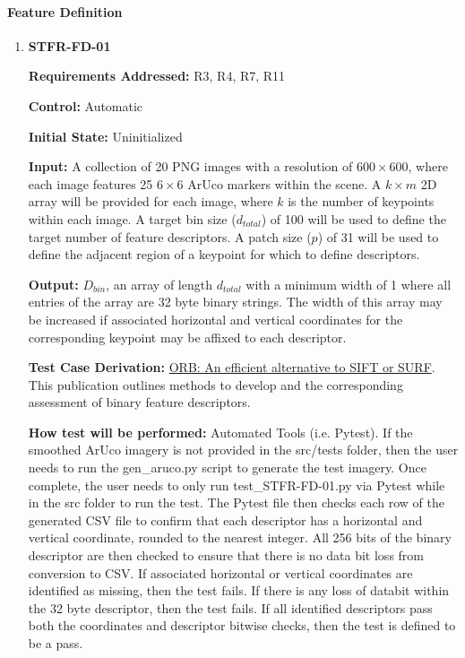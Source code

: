\documentclass[12pt, titlepage]{article}
\begin{document}
\paragraph{Feature Definition}
\begin{enumerate}
\item \hypertarget{STFR-FD-01}{\textbf{STFR-FD-01}\\}
\textbf{Requirements Addressed:} R3, R4, R7, R11

\textbf{Control:} Automatic

\textbf{Initial State:} Uninitialized

\textbf{Input:} A collection of 20 PNG images with a resolution of $600\times 600$, where each image features 25 $6\times 6$ ArUco markers within the scene. A $k\times m$ 2D array will be provided for each image, where $k$ is the number of keypoints within each image. A target bin size ($d_{total}$) of 100 will be used to define the target number of feature descriptors. A patch size ($p$) of 31 will be used to define the adjacent region of a keypoint for which to define descriptors.

\textbf{Output:} $D_{bin}$, an array of length $d_{total}$ with a minimum width of 1 where all entries of the array are 32 byte binary strings. The width of this array may be increased if associated horizontal and vertical coordinates for the corresponding keypoint may be affixed to each descriptor. 

\textbf{Test Case Derivation:} \href{https://sites.cc.gatech.edu/classes/AY2024/cs4475_summer/images/ORB_an_efficient_alternative_to_SIFT_or_SURF.pdf}
{ORB: An efficient alternative to SIFT or SURF}. This publication outlines methods to develop and the corresponding assessment of binary feature descriptors.

\textbf{How test will be performed:} Automated Tools (i.e. Pytest). If the smoothed ArUco imagery is not provided in the src/tests folder, then the user needs to run the gen\_aruco.py script to generate the test imagery. Once complete, the user needs to only run test\_STFR-FD-01.py via Pytest while in the src folder to run the test. The Pytest file then checks each row of the generated CSV file to confirm that each descriptor has a horizontal and vertical coordinate, rounded to the nearest integer. All 256 bits of the binary descriptor are then checked to ensure that there is no data bit loss from conversion to CSV. If associated horizontal or vertical coordinates are identified as missing, then the test fails. If there is any loss of databit within the 32 byte descriptor, then the test fails. If all identified descriptors pass both the coordinates and descriptor bitwise checks, then the test is defined to be a pass.
\end{enumerate}
\end{document}
